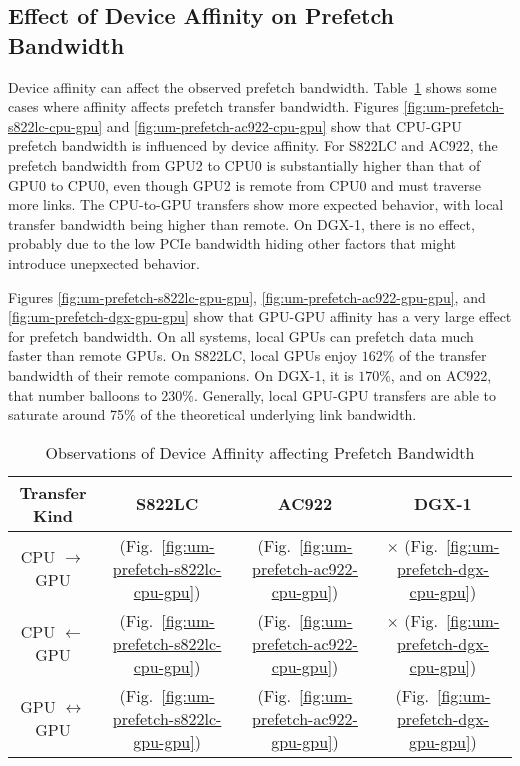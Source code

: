 \subsection{Effect of Device Affinity on Prefetch Bandwidth}

Device affinity can affect the observed prefetch bandwidth.
Table~\ref{tab:um-prefetch-affinity} shows some cases where affinity affects prefetch transfer bandwidth.
Figures \ref{fig:um-prefetch-s822lc-cpu-gpu} and \ref{fig:um-prefetch-ac922-cpu-gpu} show that CPU-GPU prefetch bandwidth is influenced by device affinity.
For S822LC and AC922, the prefetch bandwidth from GPU2 to CPU0 is substantially higher than that of GPU0 to CPU0, even though GPU2 is remote from CPU0 and must traverse more links.
The CPU-to-GPU transfers show more expected behavior, with local transfer bandwidth being higher than remote.
On DGX-1, there is no effect, probably due to the low PCIe bandwidth hiding other factors that might introduce unepxected behavior.

Figures \ref{fig:um-prefetch-s822lc-gpu-gpu}, \ref{fig:um-prefetch-ac922-gpu-gpu}, and \ref{fig:um-prefetch-dgx-gpu-gpu} show that GPU-GPU affinity has a very large effect for prefetch bandwidth.
On all systems, local GPUs can prefetch data much faster than remote GPUs.
On S822LC, local GPUs enjoy $162\%$ of the transfer bandwidth of their remote companions.
On DGX-1, it is $170\%$, and on AC922, that number balloons to $230\%$.
Generally, local GPU-GPU transfers are able to saturate around 75\% of the theoretical underlying link bandwidth.

\begin{table}[ht]
	\centering
	\caption[]{Observations of Device Affinity affecting Prefetch Bandwidth}
	\label{tab:um-prefetch-affinity}
	\begin{tabular}{|c|c|c|c|}
		\hline
		\textbf{Transfer Kind}    & \textbf{S822LC}                                        & \textbf{AC922}                                        & \textbf{DGX-1}                                      \\ \hline 
		CPU $\rightarrow$     GPU & \checkmark (Fig.~\ref{fig:um-prefetch-s822lc-cpu-gpu}) & \checkmark (Fig.~\ref{fig:um-prefetch-ac922-cpu-gpu}) & $\times$   (Fig.~\ref{fig:um-prefetch-dgx-cpu-gpu}) \\ \hline
		CPU $\leftarrow$      GPU & \checkmark (Fig.~\ref{fig:um-prefetch-s822lc-cpu-gpu}) & \checkmark (Fig.~\ref{fig:um-prefetch-ac922-cpu-gpu}) & $\times$   (Fig.~\ref{fig:um-prefetch-dgx-cpu-gpu}) \\ \hline
		GPU $\leftrightarrow$ GPU & \checkmark (Fig.~\ref{fig:um-prefetch-s822lc-gpu-gpu}) & \checkmark (Fig.~\ref{fig:um-prefetch-ac922-gpu-gpu}) & \checkmark (Fig.~\ref{fig:um-prefetch-dgx-gpu-gpu}) \\ \hline
	\end{tabular}
\end{table}

